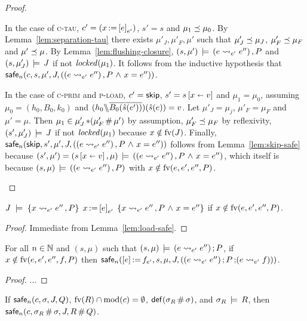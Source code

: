 \documentclass[11pt]{report}
\begin{document}
\begin{proof}
\begin{enumerate}
		In the case of \textsc{c-tau}, $c' = (x \operatorname{:\!=} \left[ e \right]_{e'})$, $s' = s$ and $\mu_1 \preceq \mu_0$. By Lemma~\ref{lem:separation-tau} there exists $\mu'_J,\mu'_F,\mu'$ such that $\mu'_J \preceq \mu_J$, $\mu'_F \preceq \mu_F$ and $\mu' \preceq \mu$. By Lemma~\ref{lem:flushing-closure}, $(s,\mu') \,\models\, (e \leadsto_{e'} e'') \operatorname{,} P$ and $(s,\mu'_J) \,\models\, J$ if not $\mathit{locked}(\mu_1)$. It follows from the inductive hypothesis that $\mathsf{safe}_{n}(c,s,\mu',J,((e \leadsto_{e'} e'') \operatorname{,} P \operatorname{\,\wedge\,} x = e''))$. 

		In the case of \textsc{c-prim} and \textsc{p-load}, $c' = \operatorname{\mathsf{skip}}$, $s' = s \left[ x \shortleftarrow v \right]$ and $\mu_1 = \mu_0$, assuming $\mu_0 = (h_0,B_0,k_0)$ and $(h_0 \backslash\!\!\backslash \overline{B_0(\hat{s}(e'))})(\hat{s}(e)) = v$. Let $\mu'_J = \mu_j$, $\mu'_F = \mu_F$ and $\mu' = \mu$. Then $\mu_1 \in \mu'_J \operatorname{\ast} (\mu'_F \operatorname{\#} \mu')$ by assumption, $\mu'_F \preceq \mu_F$ by reflexivity, $(s',\mu'_J) \,\models\, J$ if not $\mathit{locked}(\mu_1)$ because $x \notin \mathrm{fv}(J)$. Finally, $\mathsf{safe}_{n}(\operatorname{\mathsf{skip}},s',\mu',J,((e \leadsto_{e'} e'') \operatorname{,} P \operatorname{\,\wedge\,} x = e''))$ follows from Lemma~\ref{lem:skip-safe} because $(s',\mu') = (s \left[ x \shortleftarrow v \right],\mu) \,\models\, ((e \leadsto_{e'} e'') \operatorname{,} P \operatorname{\,\wedge\,} x = e'')$, which itself is because $(s,\mu) \,\models\, ((e \leadsto_{e'} e'') \operatorname{,} P)$ with $x \notin \mathrm{fv}(e,e',e'',P)$. 
	\end{enumerate}
\end{proof}

\begin{lemma}
    \label{lem:load-sound}
    $J\;\models\;\left\lbrace x \leadsto_{e'} e'' \operatorname{,} P \right\rbrace\;x \operatorname{:\!=} \left[ e \right]_{e'}\;\left\lbrace x \leadsto_{e'} e'' \operatorname{,} P \operatorname{\,\wedge\,} x = e'' \right\rbrace$ if $x \notin \mathrm{fv}(e,e',e'',P)$. 
\end{lemma} 

\begin{proof}
    Immediate from Lemma~\ref{lem:load-safe}. 
\end{proof}

\begin{lemma}
    \label{lem:store-safe}
    For all $n \in \mathbb{N}$ and $(s,\mu)$ such that $(s,\mu) \,\models\, (e \leadsto_{e'} e'') \operatorname{;} P$, if $x \notin \mathrm{fv}(e,e',e'',f,P)$ then $\mathsf{safe}_{n}(\left[ e \right] \operatorname{:\!=} f_{e'},s,\mu,J,\left((e \leadsto_{e'} e'') \operatorname{;} P \operatorname{;} (e \leadsto_{e'} f)\right))$. 
\end{lemma}

\begin{proof}
... 
\end{proof}

\begin{lemma}
	\label{lem:weak-interleaving-safe}
	If $\mathsf{safe}_{n}(c,\sigma,J,Q)$, $\mathrm{fv}(R) \cap \mathrm{mod}(c) = \operatorname{\emptyset}$, $\mathsf{def}(\sigma_R \operatorname{\#} \sigma)$, and $\sigma_R \,\models\, R$, then $\mathsf{safe}_{n}(c, \sigma_R \operatorname{\#} \sigma,J,R \operatorname{\#} Q)$. 
\end{lemma}
\end{document}

